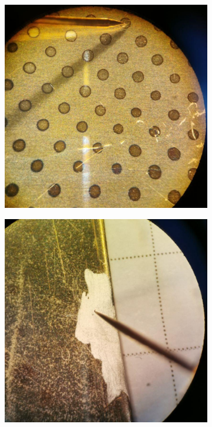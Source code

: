 \begin{figure}[tb]
	\centering
	\begin{subfigure}{0.49\textwidth}
		\centering
		\includegraphics[width=.8\textwidth]{Pics/micro-1.png}
		\caption{}
		\label{fig:micro1}
	\end{subfigure}
	\begin{subfigure}{0.49\textwidth}
		\centering
		\includegraphics[width=.8\textwidth]{Pics/micro-2.png}
		\caption{}
		\label{fig:micro2}
	\end{subfigure}
	\begin{subfigure}{\textwidth}
		\centering

\end{subfigure}
\end{figure}

